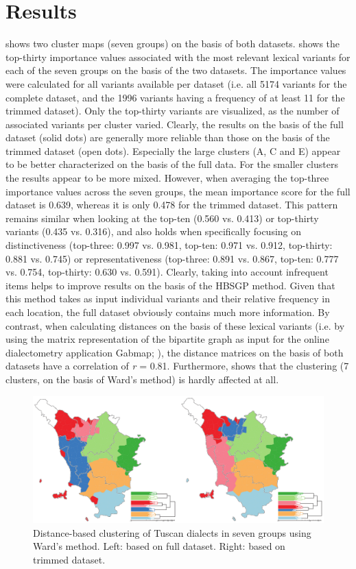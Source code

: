 \documentclass[output=paper]{LSP/langsci}
\begin{document}
\section{Results}
 shows two cluster maps (seven groups) on the basis of both datasets.  shows the top-thirty importance values associated with the most relevant lexical variants for each of the seven groups on the basis of the two datasets. The importance values were calculated for all variants available per dataset (i.e. all 5174 variants for the complete dataset, and the 1996 variants having a frequency of at least 11 for the trimmed dataset). Only the top-thirty variants are visualized, as the number of associated variants per cluster varied. Clearly, the results on the basis of the full dataset (solid dots) are generally more reliable than those on the basis of the trimmed dataset (open dots). Especially the large clusters (A, C and E) appear to be better characterized on the basis of the full data. For the smaller clusters the results appear to be more mixed. However, when averaging the top-three importance values across the seven groups, the mean importance score for the full dataset is 0.639, whereas it is only 0.478 for the trimmed dataset. This pattern remains similar when looking at the top-ten (0.560 vs. 0.413) or top-thirty variants (0.435 vs. 0.316), and also holds when specifically focusing on distinctiveness (top-three: 0.997 vs. 0.981, top-ten: 0.971 vs. 0.912, top-thirty: 0.881 vs. 0.745) or representativeness (top-three: 0.891 vs. 0.867, top-ten: 0.777 vs. 0.754, top-thirty: 0.630 vs. 0.591). Clearly, taking into account infrequent items helps to improve results on the basis of the HBSGP method. Given that this method takes as input individual variants and their relative frequency in each location, the full dataset obviously contains much more information.  By contrast, when calculating distances on the basis of these lexical variants (i.e. by using the matrix representation of the bipartite graph as input for the online dialectometry application Gabmap; \citealt{nerbonne_gabmap_2011}), the distance matrices on the basis of both datasets have a correlation of \textit{r} = 0.81. Furthermore,  shows that the clustering (7 clusters, on the basis of Ward's method) is hardly affected at all.

\begin{figure}
\includegraphics[width=\textwidth]{illustrations/wiel_monte_fig4}
\caption{Distance-based clustering of Tuscan dialects in seven groups using Ward's method. Left: based on full dataset. Right: based on trimmed dataset.}
\label{fig:4}
\end{figure}
\end{document}
